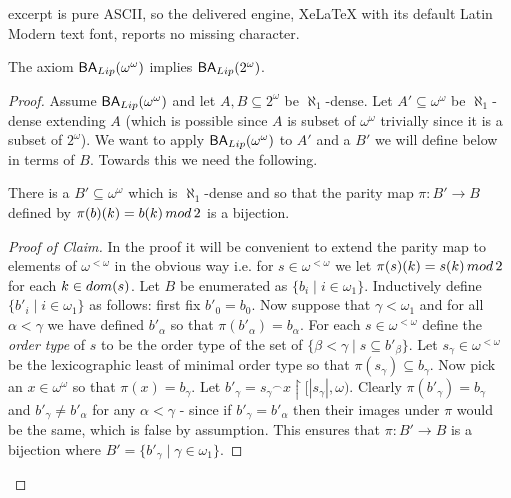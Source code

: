 \documentclass[10pt,a4paper]{amsart}
\def\BA{\mathsf{BA}}
\def\baire{\omega^\omega}
\def\cantor{2^\omega}
\def\hook{\upharpoonright}
\begin{document}
excerpt is pure ASCII, so the delivered engine, XeLaTeX with its default Latin Modern text font, reports no missing character.
\begin{lemma}
    The axiom $\BA_{\rm Lip}(\baire)$ implies $\BA_{\rm Lip}(\cantor)$. \label{firstlemma}
\end{lemma}

\begin{proof}
    Assume $\BA_{\rm Lip}(\baire)$ and let $A, B \subseteq 2^\omega$ be $\aleph_1$-dense. Let $A' \subseteq \baire$ be $\aleph_1$-dense extending $A$ (which is possible since $A$ is subset of $\baire$ trivially since it is a subset of $2^\omega$). We want to apply $\BA_{\rm Lip}(\baire)$ to $A'$ and a $B'$ we will define below in terms of $B$. Towards this we need the following.

    \begin{claim}
        There is a $B' \subseteq \baire$ which is $\aleph_1$-dense and so that the parity map $\pi:B' \to B$ defined by $\pi(b)(k) = b(k) \, {\rm mod} \, 2$ is a bijection.
    \end{claim}

    \begin{proof}[Proof of Claim]
        In the proof it will be convenient to extend the parity map to elements of $\omega^{<\omega}$ in the obvious way i.e. for $s \in \omega^{<\omega}$ we let $\pi(s) (k) = s(k) \, {\rm mod} \, 2$ for each $k \in {\rm dom}(s)$. Let $B$ be enumerated as $\{b_i\; | \; i \in \omega_1\}$. Inductively define $\{b'_i\; | \; i \in\omega_1\}$ as follows:  first fix $b'_0 = b_0$. Now suppose that $\gamma < \omega_1$ and for all $\alpha < \gamma$ we have defined $b'_\alpha$ so that $\pi (b'_\alpha) = b_\alpha$. For each $s \in \omega^{<\omega}$ define the {\em order type} of $s$ to be the order type of the set of $\{\beta < \gamma\; | \; s \subseteq b'_\beta\}$. Let $s_\gamma \in \omega^{<\omega}$ be the lexicographic least of minimal order type so that $\pi(s_\gamma) \subseteq b_\gamma$. Now pick an $x \in \baire$ so that $\pi (x) = b_\gamma$. Let $b'_\gamma = s_\gamma {}^\frown x \hook [|s_\gamma|, \omega)$. Clearly $\pi (b'_\gamma) = b_\gamma$ and $b'_\gamma \neq b'_\alpha$ for any $\alpha < \gamma$ - since if $b'_\gamma = b'_\alpha$ then their images under $\pi$ would be the same, which is false by assumption. This ensures that $\pi:B' \to B$ is a bijection where $B' = \{b'_\gamma \; | \; \gamma \in \omega_1\}$. 


\end{proof}
\end{proof}
\end{document}
